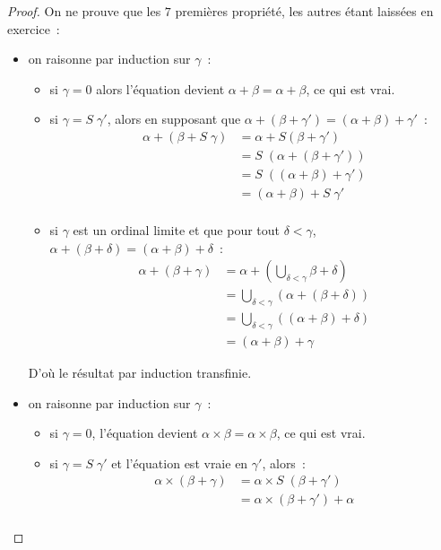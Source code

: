 \begin{proof}
  On ne prouve que les $7$ premières propriété, les autres étant laissées en
  exercice~:
  \begin{itemize}
  \item  on raisonne par induction sur $\gamma$~:
    \begin{itemize}
    \item si $\gamma = 0$ alors l'équation devient
      $\alpha + \beta = \alpha + \beta$, ce qui est vrai.
    \item si $\gamma = S\;\gamma'$, alors en supposant que
      $\alpha + (\beta + \gamma') = (\alpha + \beta) + \gamma'$~:
      \begin{align*}
        \alpha + (\beta + S\;\gamma) &= \alpha + S(\beta + \gamma')\\
        &= S\;(\alpha + (\beta + \gamma'))\\
        &= S\;((\alpha + \beta) + \gamma')\\
        &= (\alpha + \beta) + S\;\gamma'\\
      \end{align*}
    \item si $\gamma$ est un ordinal limite et que pour tout $\delta < \gamma$,
      $\alpha + (\beta + \delta) = (\alpha + \beta) + \delta$~:
      \begin{align*}
        \alpha + (\beta + \gamma) &= \alpha +
        (\bigcup_{\delta < \gamma} \beta + \delta)\\
        &= \bigcup_{\delta < \gamma} (\alpha + (\beta + \delta))\\
        &= \bigcup_{\delta < \gamma} ((\alpha + \beta) + \delta)\\
        &= (\alpha + \beta) + \gamma
      \end{align*}
    \end{itemize}
    D'où le résultat par induction transfinie.
  \item on raisonne par induction sur $\gamma$~:
    \begin{itemize}
    \item si $\gamma = 0$, l'équation devient
      $\alpha \times \beta = \alpha \times \beta$, ce qui est vrai.
    \item si $\gamma = S\;\gamma'$ et l'équation est vraie en $\gamma'$, alors~:
      \begin{align*}
        \alpha \times (\beta + \gamma) &= \alpha \times S\;(\beta + \gamma')\\
        &= \alpha \times (\beta + \gamma') + \alpha\\

\end{align*}
\end{itemize}
\end{itemize}
\end{proof}
